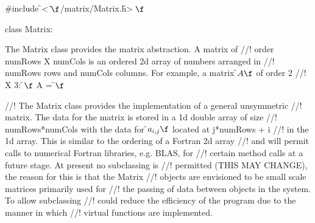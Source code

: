 
\indent \#include \f$<\tilde{}\f$/matrix/Matrix.h\f$>\f$

\indent class Matrix:


\indent The Matrix class provides the matrix abstraction. A matrix of
//! order numRows X numCols is an ordered 2d array of numbers arranged in
//! numRows rows and numCols columns. For example, a matrix \f$A\f$ of order 2
//! X 3:
\f$\f$ A =
\f$\f$

//! The Matrix class provides the implementation of a general unsymmetric
//! matrix. The data for the matrix is stored in a 1d double array of size
//! numRows*numCols with the data for \f$a_{i,j}\f$ located at j*numRows + i
//! in the 1d array. This is similar to the ordering of a Fortran 2d array
//! and will permit calls to numerical Fortran libraries, e.g. BLAS, for
//! certain method calls at a future stage. At present no subclassing is
//! permitted (THIS MAY CHANGE), the reason for this is that the Matrix
//! objects are envisioned to be small scale matrices primarily used for
//! the passing of data between objects in the system. To allow subclassing
//! could reduce the efficiency of the program due to the manner in which 
//! virtual functions are implemented. 

